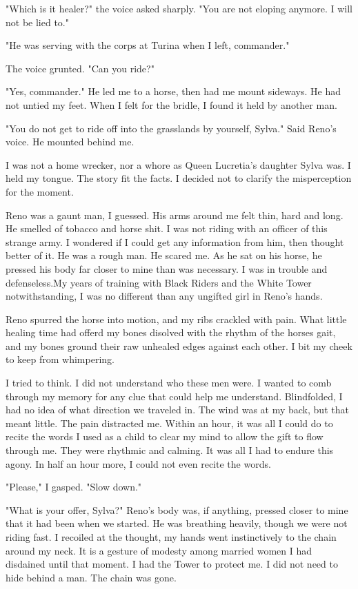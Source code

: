 \documentclass{article}
\begin{document}
"Which is it healer?" the voice asked sharply. "You are not eloping anymore. I will not be lied to."

"He was serving with the corps at Turina when I left, commander."

The voice grunted. "Can you ride?"

"Yes, commander." He led me to a horse, then had me mount sideways. He had not untied my feet. When I felt for the bridle, I found it held by another man.

"You do not get to ride off into the grasslands by yourself, Sylva." Said Reno's voice. He mounted behind me.

I was not a home wrecker, nor a whore as Queen Lucretia's daughter Sylva was. I held my tongue. The story fit the facts. I decided not to clarify the misperception for the moment. 

Reno was a gaunt man, I guessed. His arms around me felt thin, hard and long. He smelled of tobacco and horse shit. I was not riding with an officer of this strange army. I wondered if I could get any information from him, then thought better of it. He was a rough man. He scared me. As he sat on his horse, he pressed his body far closer to mine than was necessary. I was in trouble and defenseless.My years of training with Black Riders and the White Tower notwithstanding, I was no different than any ungifted girl in Reno's hands. 

Reno spurred the horse into motion, and my ribs crackled with pain. What little healing time had offerd my bones disolved with the rhythm of the horses gait, and my bones ground their raw unhealed edges against each other. I bit my cheek to keep from whimpering.

I tried to think. I did not understand who these men were. I wanted to comb through my memory for any clue that could help me understand. Blindfolded, I had no idea of what direction we traveled in. The wind was at my back, but that meant little. The pain distracted me. Within an hour, it was all I could do to recite the words I used as a child to clear my mind to allow the gift to flow through me. They were rhythmic and calming. It was all I had to endure this agony. In half an hour more, I could not even recite the words.

"Please," I gasped. "Slow down."

"What is your offer, Sylva?" Reno's body was, if anything, pressed closer to mine that it had been when we started. He was breathing heavily, though we were not riding fast. I recoiled at the thought, my hands went instinctively to the chain around my neck. It is a gesture of modesty among married women I had disdained until that moment. I had the Tower to protect me. I did not need to hide behind a man. The chain was gone.
\end{document}
